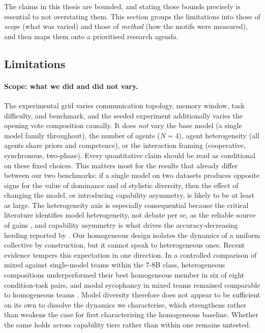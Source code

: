 
The claims in this thesis are bounded, and stating those bounds precisely is
essential to not overstating them. This section groups the limitations into those
of \emph{scope} (what was varied) and those of \emph{method} (how the motifs were
measured), and then maps them onto a prioritised research agenda.

\subsection{Limitations}
\label{sec:discussion:limitations}

\paragraph{Scope: what we did and did not vary.}
The experimental grid varies communication topology, memory window, task
difficulty, and benchmark, and the seeded experiment additionally varies the
opening vote composition causally. It does \emph{not} vary the base model (a
single model family throughout), the number of agents ($N = 4$), agent
heterogeneity (all agents share priors and competence), or the interaction
framing (cooperative, synchronous, two-phase). Every quantitative claim should be
read as conditional on these fixed choices. This matters most for the results that
already differ between our two benchmarks: if a single model on two datasets
produces opposite signs for the value of dominance and of stylistic diversity,
then the effect of changing the model, or introducing capability asymmetry, is
likely to be at least as large. The heterogeneity axis is especially consequential
because the critical literature identifies model heterogeneity, not debate per se,
as the reliable source of gains \citep{liu2025stopovervaluing, chen2024reconcile},
and capability asymmetry is what drives the accuracy-decreasing herding reported by
\citet{wynn2025talk}. Our homogeneous design isolates the dynamics of a uniform
collective by construction, but it cannot speak to heterogeneous ones.
Recent evidence tempers this expectation in one direction. In a controlled
comparison of mixed against single-model teams within the 7-8B class,
heterogeneous compositions underperformed their best homogeneous member in six of
eight condition-task pairs, and modal sycophancy in mixed teams remained
comparable to homogeneous teams \citep{bertalanic2026costofconsensus}. Model
diversity therefore does not appear to be sufficient on its own to dissolve the
dynamics we characterise, which strengthens rather than weakens the case for
first characterising the homogeneous baseline. Whether the same holds across
capability tiers rather than within one remains untested.

